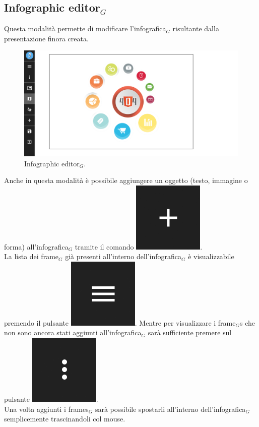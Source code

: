 \subsection{Infographic editor$_G$}
Questa modalità permette di modificare l'infografica$_G$ risultante dalla presentazione finora creata.
\begin{figure}[!h]
\begin{center}
\includegraphics[scale=0.35]{img/infographic.png}
\caption{Infographic editor$_G$.}
\end{center}
\end{figure}

Anche in questa modalità è possibile aggiungere un oggetto (testo, immagine o forma) all'infografica$_G$ tramite il comando \includegraphics[scale=0.4]{img/add_object.png}.\\
La lista dei frame$_G$ già presenti all'interno dell'infografica$_G$ è visualizzabile premendo il pulsante \includegraphics[scale=0.4]{img/added_frames.png}.
Mentre per visualizzare i frame$_G$s che non sono ancora stati aggiunti all'infografica$_G$ sarà sufficiente premere sul pulsante \includegraphics[scale=0.4]{img/frames_to_be_added.png}.\\
Una volta aggiunti i frames$_G$ sarà possibile spostarli all'interno dell'infografica$_G$ semplicemente trascinandoli col mouse.

